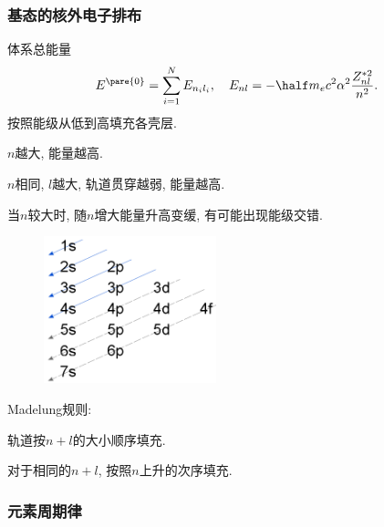 \documentclass[hidelinks]{ctexart}
\begin{document}

\subsubsection{基态的核外电子排布} %
\label{ssub:基态的核外电子排布}

体系总能量
\[ E^{\pare{0}} = \sum_{i=1}^N E_{n_i l_i},\quad E_{nl} = -\half m_e c^2\alpha^2 \frac{Z_{nl}^{*2}}{n^2}. \]
按照能级从低到高填充各壳层.
\begin{cenum}
    \item $n$越大, 能量越高.
    \item $n$相同, $l$越大, 轨道贯穿越弱, 能量越高.
    \item 当$n$较大时, 随$n$增大能量升高变缓, 有可能出现能级交错.
\end{cenum}
\begin{figure}[ht]
    \center
    \includegraphics[width=5cm]{src/madelung-rule.png}
\end{figure}
\begin{resume}
    Madelung规则:
    \begin{cenum}
        \item 轨道按$n+l$的大小顺序填充.
        \item 对于相同的$n+l$, 按照$n$上升的次序填充.
    \end{cenum}
\end{resume}


\subsubsection{元素周期律} %
\label{ssub:元素周期律}
\end{document}
